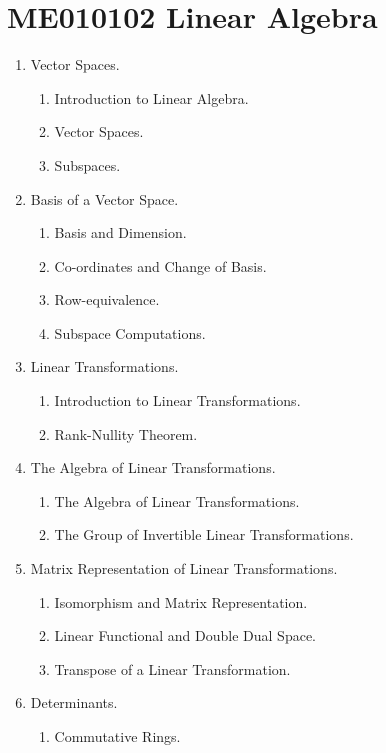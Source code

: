 \chapter{ME010102 Linear Algebra}
\begin{enumerate}[label=Topic \arabic*]
	\item Vector Spaces.
	\begin{enumerate}[label=Session \arabic*]
		\item Introduction to Linear Algebra.
		\item Vector Spaces.
		\item Subspaces.
	\end{enumerate}
	\item Basis of a Vector Space.
	\begin{enumerate}[label=Session \arabic*]
		\item Basis and Dimension.
		\item Co-ordinates and Change of Basis.
		\item Row-equivalence.
		\item Subspace Computations.
	\end{enumerate}
	\item Linear Transformations.
	\begin{enumerate}[label=Session \arabic*]
		\item Introduction to Linear Transformations.
		\item Rank-Nullity Theorem.
	\end{enumerate}
	\item The Algebra of Linear Transformations.
	\begin{enumerate}[label=Session \arabic*]
		\item The Algebra of Linear Transformations.
		\item The Group of Invertible Linear Transformations.
	\end{enumerate}
	\item Matrix Representation of Linear Transformations.
	\begin{enumerate}[label=Session \arabic*]
		\item Isomorphism and Matrix Representation.
		\item Linear Functional and Double Dual Space.
		\item Transpose of a Linear Transformation.
	\end{enumerate}
	\item Determinants.
	\begin{enumerate}[label=Session \arabic*]
		\item Commutative Rings.

\end{enumerate}
\end{enumerate}
